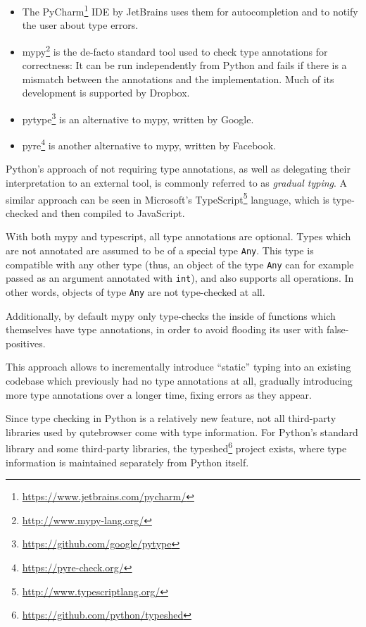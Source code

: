 \documentclass[a4paper,parskip=full]{scrreprt}
\begin{document}
\label{typecheck-tools}
\begin{itemize}
  \item The PyCharm\footnote{\url{https://www.jetbrains.com/pycharm/}} IDE by
    JetBrains uses them for autocompletion and to notify the user about type
    errors.
  \item mypy\footnote{\url{http://www.mypy-lang.org/}} is the de-facto standard
    tool used to check type annotations for correctness: It can be run
    independently from Python and fails if there is a mismatch between the
    annotations and the implementation. Much of its development is supported by
    Dropbox.
  \item pytype\footnote{\url{https://github.com/google/pytype}} is an
    alternative to mypy, written by Google.
  \item pyre\footnote{\url{https://pyre-check.org/}} is another alternative
    to mypy, written by Facebook.
\end{itemize}

Python's approach of not requiring type annotations, as well as delegating their
interpretation to an external tool, is commonly referred to as
\emph{gradual typing}. A similar approach can be seen in Microsoft's
TypeScript\footnote{\url{http://www.typescriptlang.org/}} language, which is
type-checked and then compiled to JavaScript.

With both mypy and typescript, all type annotations are optional. Types which
are not annotated are assumed to be of a special type \verb|Any|. This type is
compatible with any other type (thus, an object of the type \verb|Any| can for
example passed as an argument annotated with \verb|int|), and also supports all
operations. In other words, objects of type \verb|Any| are not type-checked at
all.

Additionally, by default mypy only type-checks the inside of functions which
themselves have type annotations, in order to avoid flooding its user with
false-positives.

This approach allows to incrementally introduce ``static'' typing into an
existing codebase which previously had no type annotations at all, gradually
introducing more type annotations over a longer time, fixing errors as they
appear.

Since type checking in Python is a relatively new feature, not all third-party
libraries used by qutebrowser come with type information. For Python's standard
library and some third-party libraries, the
typeshed\footnote{\url{https://github.com/python/typeshed}} project exists,
where type information is maintained separately from Python itself.
\end{document}
